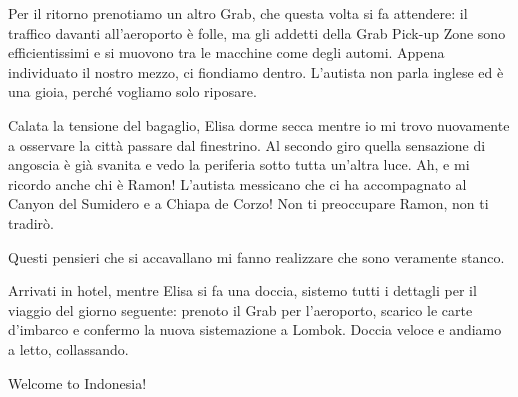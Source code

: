 Per il ritorno prenotiamo un altro Grab, che questa volta si fa attendere: il traffico davanti all'aeroporto è folle, ma gli addetti della Grab Pick-up Zone sono efficientissimi e si muovono tra le macchine come degli automi. Appena individuato il nostro mezzo, ci fiondiamo dentro. L'autista non parla inglese ed è una gioia, perché vogliamo solo riposare.

Calata la tensione del bagaglio, Elisa dorme secca mentre io mi trovo nuovamente a osservare la città passare dal finestrino. Al secondo giro quella sensazione di angoscia è già svanita e vedo la periferia sotto tutta un'altra luce. Ah, e mi ricordo anche chi è Ramon! L'autista messicano che ci ha accompagnato al Canyon del Sumidero e a Chiapa de Corzo! Non ti preoccupare Ramon, non ti tradirò.

Questi pensieri che si accavallano mi fanno realizzare che sono veramente stanco.

Arrivati in hotel, mentre Elisa si fa una doccia, sistemo tutti i dettagli per il viaggio del giorno seguente: prenoto il Grab per l'aeroporto, scarico le carte d'imbarco e confermo la nuova sistemazione a Lombok. Doccia veloce e andiamo a letto, collassando.

Welcome to Indonesia!



